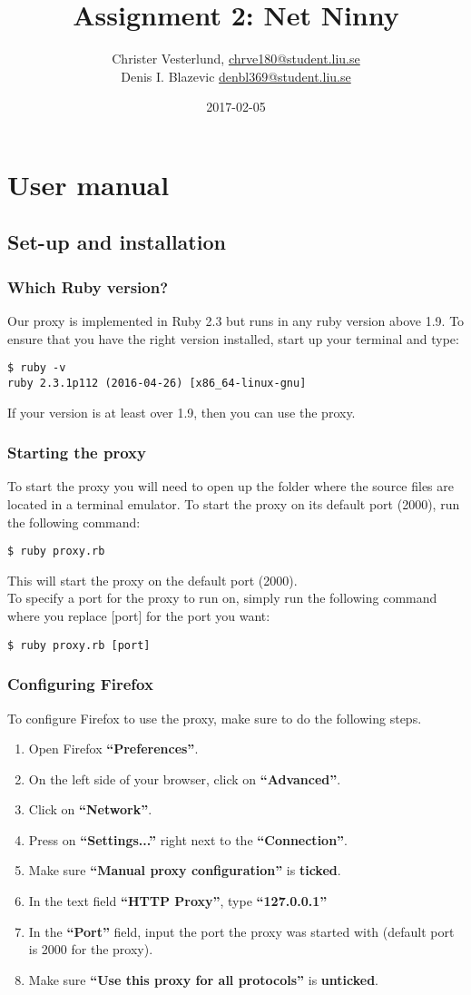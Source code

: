 \documentclass{mall}
\author{Christer Vesterlund, \url{chrve180@student.liu.se}\\
  Denis I. Blazevic \url{denbl369@student.liu.se}}
\title{Assignment 2: Net Ninny}
\date{2017-02-05}
\begin{document}
\projectpage
\tableofcontents
\newpage 

\section{User manual} 

\subsection{Set-up and installation}
\subsubsection{Which Ruby version?}
Our proxy is implemented in Ruby 2.3 but runs in any ruby version above 1.9. To ensure that you have the right version installed, start up your terminal and type:
\begin{verbatim}
$ ruby -v
ruby 2.3.1p112 (2016-04-26) [x86_64-linux-gnu]
\end{verbatim}
If your version is at least over 1.9, then you can use the proxy.\\
\subsubsection{Starting the proxy}
To start the proxy you will need to open up the folder where the source files are located in a terminal emulator. To start the proxy on its default port (2000), run the following command:
\begin{verbatim}
$ ruby proxy.rb
\end{verbatim}
This will start the proxy on the default port (2000).
\\
To specify a port for the proxy to run on, simply run the following command where you replace [port] for the port you want:
\begin{verbatim}
$ ruby proxy.rb [port]
\end{verbatim}
\subsubsection{Configuring Firefox}
To configure Firefox to use the proxy, make sure to do the following steps. 
\begin{enumerate}
	\item Open Firefox \textbf{``Preferences''}.
	\item On the left side of your browser, click on \textbf{``Advanced''}.
	\item Click on \textbf{``Network''}.
	\item Press on \textbf{``Settings...''} right next to the \textbf{``Connection''}.
	\item Make sure \textbf{``Manual proxy configuration''} is \textbf{ticked}.
	\item In the text field \textbf{``HTTP Proxy''}, type \textbf{``127.0.0.1''}
	\item In the \textbf{``Port''} field, input the port the proxy was started with (default port is 2000 for the proxy).
	\item Make sure \textbf{``Use this proxy for all protocols''} is \textbf{unticked}.
\end{enumerate}
\end{document}
